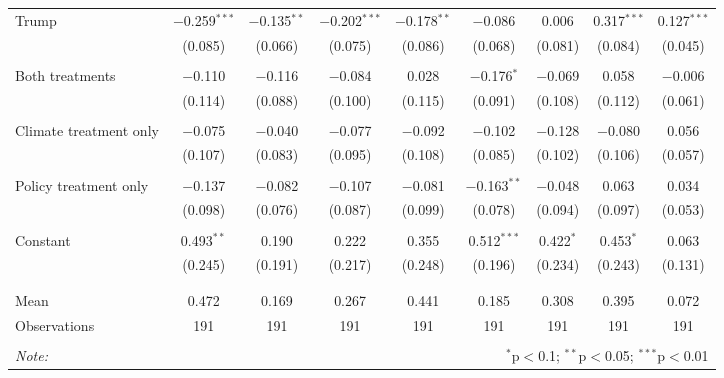 \begin{tabular}{@{\extracolsep{5pt}}lcccccccc}
 Trump & $-$0.259$^{***}$ & $-$0.135$^{**}$ & $-$0.202$^{***}$ & $-$0.178$^{**}$ & $-$0.086 & 0.006 & 0.317$^{***}$ & 0.127$^{***}$ \\ 
  & (0.085) & (0.066) & (0.075) & (0.086) & (0.068) & (0.081) & (0.084) & (0.045) \\ 
  & & & & & & & & \\ 
 Both treatments & $-$0.110 & $-$0.116 & $-$0.084 & 0.028 & $-$0.176$^{*}$ & $-$0.069 & 0.058 & $-$0.006 \\ 
  & (0.114) & (0.088) & (0.100) & (0.115) & (0.091) & (0.108) & (0.112) & (0.061) \\ 
  & & & & & & & & \\ 
 Climate treatment only & $-$0.075 & $-$0.040 & $-$0.077 & $-$0.092 & $-$0.102 & $-$0.128 & $-$0.080 & 0.056 \\ 
  & (0.107) & (0.083) & (0.095) & (0.108) & (0.085) & (0.102) & (0.106) & (0.057) \\ 
  & & & & & & & & \\ 
 Policy treatment only & $-$0.137 & $-$0.082 & $-$0.107 & $-$0.081 & $-$0.163$^{**}$ & $-$0.048 & 0.063 & 0.034 \\ 
  & (0.098) & (0.076) & (0.087) & (0.099) & (0.078) & (0.094) & (0.097) & (0.053) \\ 
  & & & & & & & & \\ 
 Constant & 0.493$^{**}$ & 0.190 & 0.222 & 0.355 & 0.512$^{***}$ & 0.422$^{*}$ & 0.453$^{*}$ & 0.063 \\ 
  & (0.245) & (0.191) & (0.217) & (0.248) & (0.196) & (0.234) & (0.243) & (0.131) \\ 
  & & & & & & & & \\ 
\hline \\[-1.8ex] 
Mean & 0.472 & 0.169 & 0.267 & 0.441 & 0.185 & 0.308 & 0.395 & 0.072 \\ 
Observations & 191 & 191 & 191 & 191 & 191 & 191 & 191 & 191 \\ 
\hline 
\hline \\[-1.8ex] 
\textit{Note:}  & \multicolumn{8}{r}{$^{*}$p$<$0.1; $^{**}$p$<$0.05; $^{***}$p$<$0.01} \\ 
\end{tabular} 
